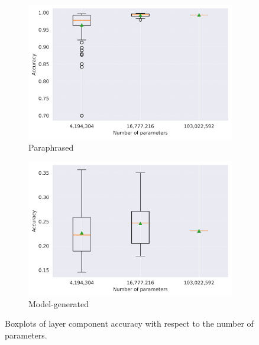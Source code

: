 \begin{figure}[H]
    \centering
    \begin{subfigure}[h]{0.495\textwidth}
        \centering
        \includegraphics[width=\textwidth]{figures/results/paraphrased/accuracy_per_layer_boxplot.png}
        \caption{Paraphrased}
        \label{fig:accuracy_per_layer_boxplot_paraphrased}
    \end{subfigure}
    \hfill
    \begin{subfigure}[h]{0.495\textwidth}
        \centering
        \includegraphics[width=\textwidth]{figures/results/model-generated/accuracy_per_layer_boxplot.png}
        \caption{Model-generated}
        \label{fig:accuracy_per_layer_boxplot_model_generated}
    \end{subfigure}
    \caption{Boxplots of layer component accuracy with respect to the number of parameters.}
    \label{fig:accuracy_per_layer_boxplot}
\end{figure}


